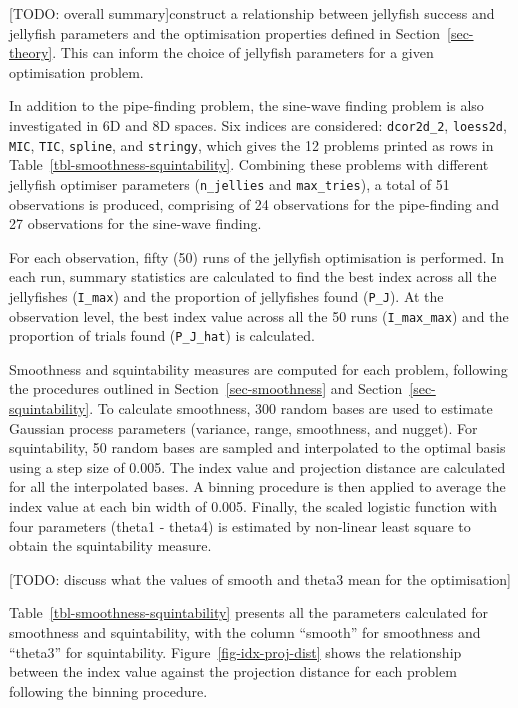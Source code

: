 \documentclass[
  number,
  preprint,
  3p]{elsarticle}
\begin{document}
{[}TODO: overall summary{]}construct a relationship between jellyfish
success and jellyfish parameters and the optimisation properties defined
in Section~\ref{sec-theory}. This can inform the choice of jellyfish
parameters for a given optimisation problem.

In addition to the pipe-finding problem, the sine-wave finding problem
is also investigated in 6D and 8D spaces. Six indices are considered:
\texttt{dcor2d\_2}, \texttt{loess2d}, \texttt{MIC}, \texttt{TIC},
\texttt{spline}, and \texttt{stringy}, which gives the 12 problems
printed as rows in Table~\ref{tbl-smoothness-squintability}. Combining
these problems with different jellyfish optimiser parameters
(\texttt{n\_jellies} and \texttt{max\_tries}), a total of 51
observations is produced, comprising of 24 observations for the
pipe-finding and 27 observations for the sine-wave finding.

For each observation, fifty (50) runs of the jellyfish optimisation is
performed. In each run, summary statistics are calculated to find the
best index across all the jellyfishes (\texttt{I\_max}) and the
proportion of jellyfishes found (\texttt{P\_J}). At the observation
level, the best index value across all the 50 runs
(\texttt{I\_max\_max}) and the proportion of trials found
(\texttt{P\_J\_hat}) is calculated.

Smoothness and squintability measures are computed for each problem,
following the procedures outlined in Section~\ref{sec-smoothness} and
Section~\ref{sec-squintability}. To calculate smoothness, 300 random
bases are used to estimate Gaussian process parameters (variance, range,
smoothness, and nugget). For squintability, 50 random bases are sampled
and interpolated to the optimal basis using a step size of 0.005. The
index value and projection distance are calculated for all the
interpolated bases. A binning procedure is then applied to average the
index value at each bin width of 0.005. Finally, the scaled logistic
function with four parameters (theta1 - theta4) is estimated by
non-linear least square to obtain the squintability measure.

{[}TODO: discuss what the values of smooth and theta3 mean for the
optimisation{]}

Table~\ref{tbl-smoothness-squintability} presents all the parameters
calculated for smoothness and squintability, with the column ``smooth''
for smoothness and ``theta3'' for squintability.
Figure~\ref{fig-idx-proj-dist} shows the relationship between the index
value against the projection distance for each problem following the
binning procedure.
\end{document}
